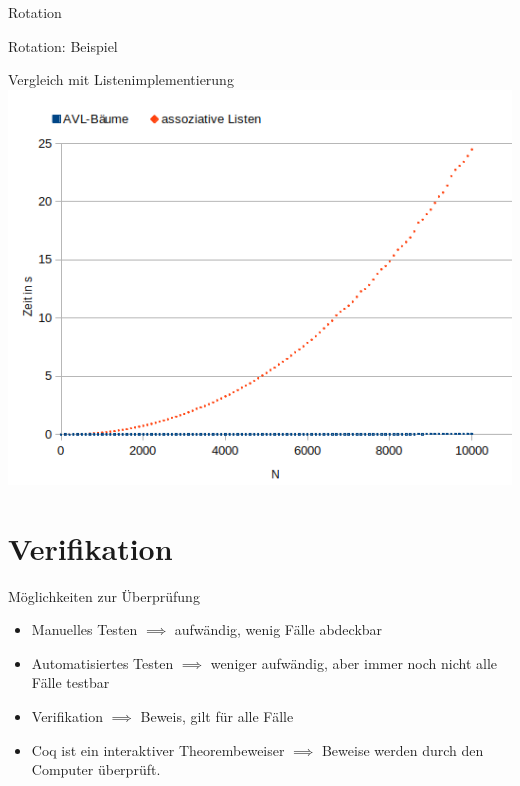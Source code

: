 \documentclass{beamer}
\begin{document}
\begin{frame}{Rotation}
  
\end{frame}

\begin{frame}{Rotation: Beispiel}
  \centering
\end{frame}

\begin{frame}{Vergleich mit Listenimplementierung}
 \includegraphics[height=0.8\textheight, width=\textwidth]{../paper/bench.png}
\end{frame}

\section{Verifikation}
\begin{frame}{Möglichkeiten zur Überprüfung}
  \begin{itemize}
    \item Manuelles Testen $\implies$ aufwändig, wenig Fälle abdeckbar
    \item Automatisiertes Testen $\implies$ weniger aufwändig, aber immer noch
      nicht alle Fälle testbar
    \item Verifikation $\implies$ Beweis, gilt für alle Fälle
    \item Coq ist ein interaktiver Theorembeweiser $\implies$ Beweise werden
      durch den Computer überprüft.
  \end{itemize}
\end{frame}
\end{document}
